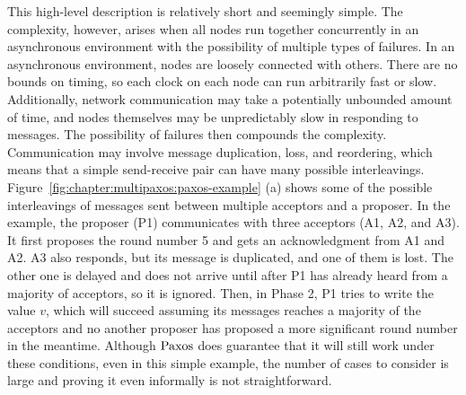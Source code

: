 This high-level description is relatively short and seemingly simple.
The complexity, however, arises when all nodes run together concurrently in an asynchronous environment with the possibility of multiple types of failures.
In an asynchronous environment, nodes are loosely connected with others.
There are no bounds on timing, so each clock on each node can run arbitrarily fast or slow.
Additionally, network communication may take a potentially unbounded amount of time,
and nodes themselves may be unpredictably slow in responding to messages.
The possibility of failures then compounds the complexity.
Communication may involve message duplication, loss, and reordering, which means that a simple send-receive pair can have many possible interleavings.
Figure~\ref{fig:chapter:multipaxos:paxos-example} (a) shows some of the possible interleavings of messages sent between multiple acceptors and a proposer.
In the example, the proposer (P1) communicates with three acceptors (A1, A2, and A3).
It first proposes the round number 5 and gets an acknowledgment from A1 and A2.
A3 also responds, but its message is duplicated, and one of them is lost.
The other one is delayed and does not arrive until after P1 has already heard from a majority of acceptors, so it is ignored.
Then, in Phase 2, P1 tries to write the value $v$, which will succeed assuming its messages reaches a majority of the acceptors and no
another proposer has proposed a more significant round number in the meantime.
Although $\mathrm{Paxos}$ does guarantee that it will still work under these conditions, even in this simple example,
the number of cases to consider is large and proving it even informally is not straightforward.

